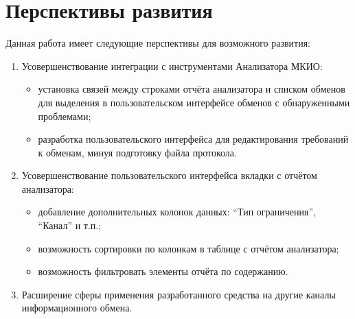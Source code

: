 \section{Перспективы развития} 
\label{sec:prospects}

Данная работа имеет следующие перспективы для возможного развития:

\begin{enumerate}
 \item Усовершенствование интеграции с  инструментами Анализатора МКИО:
 \begin{itemize}
  \item установка связей между строками отчёта анализатора и списком обменов 
для выделения в пользовательском интерфейсе обменов с обнаруженными проблемами;
  \item разработка пользовательского интерфейса для редактирования требований к 
обменам, минуя подготовку файла протокола.
 \end{itemize}
 
 \item Усовершенствование пользовательского интерфейса вкладки с отчётом 
анализатора:
 \begin{itemize}
  \item добавление дополнительных колонок данных: ``Тип ограничения'', 
``Канал'' и т.п.;
  \item возможность сортировки по колонкам в таблице с отчётом анализатора;
  \item возможность фильтровать элементы отчёта по содержанию.
 \end{itemize}

 \item Расширение сферы применения разработанного средства на другие каналы 
информационного обмена.
\end{enumerate}

